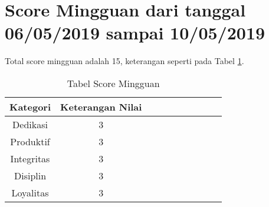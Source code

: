 \section{Score Mingguan dari tanggal 06/05/2019 sampai 10/05/2019}
Total score mingguan adalah 15,  keterangan seperti pada Tabel \ref{table:scoremingguan11}.
\begin{table}[!ht]
\centering
\begin{tabular}{ |c|c|c|c|c|c|c|c|c|c| }
\hline
Kategori & Keterangan Nilai \\
\hline
Dedikasi & 3 \\
\hline
Produktif & 3 \\
\hline
Integritas & 3 \\
\hline
Disiplin & 3 \\
\hline
Loyalitas & 3 \\
\hline
\end{tabular}
\caption{Tabel Score Mingguan}
\label{table:scoremingguan11}
\end{table}